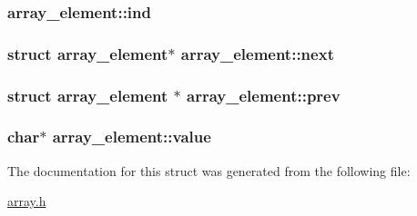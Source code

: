 \subsubsection[{\texorpdfstring{ind}{ind}}]{ array\+\_\+element\+::ind}\hypertarget{structarray__element_a5b124be3fa60c35575c578eff8110a2d}{}\label{structarray__element_a5b124be3fa60c35575c578eff8110a2d}
\subsubsection[{\texorpdfstring{next}{next}}]{\setlength{\rightskip}{0pt plus 5cm}struct {\bf array\+\_\+element}$\ast$ array\+\_\+element\+::next}\hypertarget{structarray__element_a4da2f65f567163c403ec1bbe61860c0f}{}\label{structarray__element_a4da2f65f567163c403ec1bbe61860c0f}
\subsubsection[{\texorpdfstring{prev}{prev}}]{\setlength{\rightskip}{0pt plus 5cm}struct {\bf array\+\_\+element} $\ast$ array\+\_\+element\+::prev}\hypertarget{structarray__element_a065d6ae08152f864cf45e662e1a7ffec}{}\label{structarray__element_a065d6ae08152f864cf45e662e1a7ffec}
\subsubsection[{\texorpdfstring{value}{value}}]{\setlength{\rightskip}{0pt plus 5cm}char$\ast$ array\+\_\+element\+::value}\hypertarget{structarray__element_aa4bea33277d92a610382ad78a1ca765d}{}\label{structarray__element_aa4bea33277d92a610382ad78a1ca765d}


The documentation for this struct was generated from the following file\+:\begin{DoxyCompactItemize}
\item 
\hyperlink{array_8h}{array.\+h}\end{DoxyCompactItemize}

